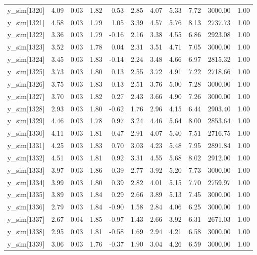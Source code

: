 \begin{table}[ht]
\begin{tabular}{rrrrrrrrrrr}
  y\_sim[1320] & 4.09 & 0.03 & 1.82 & 0.53 & 2.85 & 4.07 & 5.33 & 7.72 & 3000.00 & 1.00 \\ 
  y\_sim[1321] & 4.58 & 0.03 & 1.79 & 1.05 & 3.39 & 4.57 & 5.76 & 8.13 & 2737.73 & 1.00 \\ 
  y\_sim[1322] & 3.36 & 0.03 & 1.79 & -0.16 & 2.16 & 3.38 & 4.55 & 6.86 & 2923.08 & 1.00 \\ 
  y\_sim[1323] & 3.52 & 0.03 & 1.78 & 0.04 & 2.31 & 3.51 & 4.71 & 7.05 & 3000.00 & 1.00 \\ 
  y\_sim[1324] & 3.45 & 0.03 & 1.83 & -0.14 & 2.24 & 3.48 & 4.66 & 6.97 & 2815.32 & 1.00 \\ 
  y\_sim[1325] & 3.73 & 0.03 & 1.80 & 0.13 & 2.55 & 3.72 & 4.91 & 7.22 & 2718.66 & 1.00 \\ 
  y\_sim[1326] & 3.75 & 0.03 & 1.83 & 0.13 & 2.51 & 3.76 & 5.00 & 7.28 & 3000.00 & 1.00 \\ 
  y\_sim[1327] & 3.70 & 0.03 & 1.82 & 0.27 & 2.43 & 3.66 & 4.90 & 7.26 & 3000.00 & 1.00 \\ 
  y\_sim[1328] & 2.93 & 0.03 & 1.80 & -0.62 & 1.76 & 2.96 & 4.15 & 6.44 & 2903.40 & 1.00 \\ 
  y\_sim[1329] & 4.46 & 0.03 & 1.78 & 0.97 & 3.24 & 4.46 & 5.64 & 8.00 & 2853.64 & 1.00 \\ 
  y\_sim[1330] & 4.11 & 0.03 & 1.81 & 0.47 & 2.91 & 4.07 & 5.40 & 7.51 & 2716.75 & 1.00 \\ 
  y\_sim[1331] & 4.25 & 0.03 & 1.83 & 0.70 & 3.03 & 4.23 & 5.48 & 7.95 & 2891.84 & 1.00 \\ 
  y\_sim[1332] & 4.51 & 0.03 & 1.81 & 0.92 & 3.31 & 4.55 & 5.68 & 8.02 & 2912.00 & 1.00 \\ 
  y\_sim[1333] & 3.97 & 0.03 & 1.86 & 0.39 & 2.77 & 3.92 & 5.20 & 7.73 & 3000.00 & 1.00 \\ 
  y\_sim[1334] & 3.99 & 0.03 & 1.80 & 0.39 & 2.82 & 4.01 & 5.15 & 7.70 & 2759.97 & 1.00 \\ 
  y\_sim[1335] & 3.89 & 0.03 & 1.84 & 0.29 & 2.66 & 3.89 & 5.13 & 7.45 & 3000.00 & 1.00 \\ 
  y\_sim[1336] & 2.79 & 0.03 & 1.84 & -0.90 & 1.58 & 2.84 & 4.06 & 6.25 & 3000.00 & 1.00 \\ 
  y\_sim[1337] & 2.67 & 0.04 & 1.85 & -0.97 & 1.43 & 2.66 & 3.92 & 6.31 & 2671.03 & 1.00 \\ 
  y\_sim[1338] & 2.95 & 0.03 & 1.81 & -0.58 & 1.69 & 2.94 & 4.21 & 6.58 & 3000.00 & 1.00 \\ 
  y\_sim[1339] & 3.06 & 0.03 & 1.76 & -0.37 & 1.90 & 3.04 & 4.26 & 6.59 & 3000.00 & 1.00 \\ 

\end{tabular}
\end{table}
